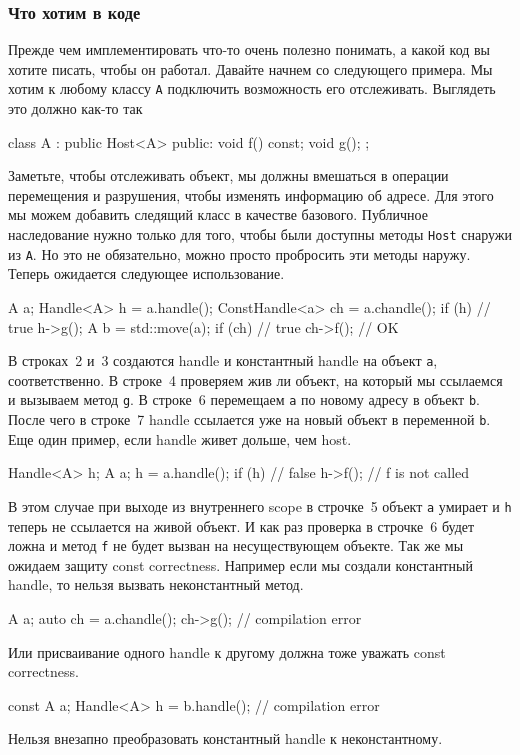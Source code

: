 \subsubsection{Что хотим в коде}

Прежде чем имплементировать что-то очень полезно понимать, а какой код вы хотите писать, чтобы он работал.
Давайте начнем со следующего примера.
Мы хотим к любому классу \verb"A" подключить возможность его отслеживать.
Выглядеть это должно как-то так
\begin{cppcode}
class A : public Host<A> {
public:
  void f() const;
  void g();
};
\end{cppcode}
Заметьте, чтобы отслеживать объект, мы должны вмешаться в операции перемещения и разрушения, чтобы изменять информацию об адресе.
Для этого мы можем добавить следящий класс в качестве базового.
Публичное наследование нужно только для того, чтобы были доступны методы \verb"Host" снаружи из \verb"A".
Но это не обязательно, можно просто пробросить эти методы наружу.
Теперь ожидается следующее использование.
\begin{cppcode}
A a;
Handle<A> h = a.handle();
ConstHandle<a> ch = a.chandle();
if (h) // true
  h->g();
A b = std::move(a);
if (ch) // true
  ch->f(); // OK
\end{cppcode}
В строках~2 и~3 создаются handle и константный handle на объект \verb"a", соответственно.
В строке~4 проверяем жив ли объект, на который мы ссылаемся и вызываем метод \verb"g".
В строке~6 перемещаем \verb"a" по новому адресу в объект \verb"b".
После чего в строке~7 handle ссылается уже на новый объект в переменной \verb"b".
Еще один пример, если handle живет дольше, чем host.
\begin{cppcode}
Handle<A> h;
{
  A a;
  h = a.handle();
}
if (h) // false
  h->f();  // f is not called
\end{cppcode}
В этом случае при выходе из внутреннего scope в строчке~5 объект \verb"a" умирает и \verb"h" теперь не ссылается на живой объект.
И как раз проверка в строчке~6 будет ложна и метод \verb"f" не будет вызван на несуществующем объекте.
Так же мы ожидаем защиту const correctness.
Например если мы создали константный handle, то нельзя вызвать неконстантный метод.
\begin{cppcode}
A a;
auto ch = a.chandle();
ch->g(); // compilation error
\end{cppcode}
Или присваивание одного handle к другому должна тоже уважать const correctness.
\begin{cppcode}
const A a;
Handle<A> h = b.handle(); // compilation error
\end{cppcode}
Нельзя внезапно преобразовать константный handle к неконстантному.

